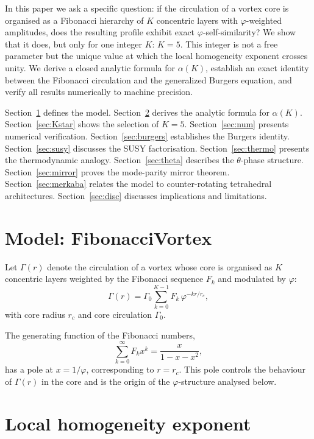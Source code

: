\documentclass[twocolumn,aps,prfluids]{revtex4-2}
\newcommand{\phig}{\varphi}
\newcommand{\Gam}{\Gamma}
\begin{document}
In this paper we ask a specific question: if the circulation of a vortex
core is organised as a Fibonacci hierarchy of $K$ concentric layers with
$\phig$-weighted amplitudes, does the resulting profile exhibit exact
$\phig$-self-similarity? We show that it does, but only for one integer
$K$: $K=5$. This integer is not a free parameter but the unique value
at which the local homogeneity exponent crosses unity. We derive a closed
analytic formula for $\alpha(K)$, establish an exact identity between the
Fibonacci circulation and the generalized Burgers equation, and verify
all results numerically to machine precision.

Section~\ref{sec:model} defines the model. Section~\ref{sec:alpha} derives
the analytic formula for $\alpha(K)$. Section~\ref{sec:Kstar} shows the
selection of $K=5$. Section~\ref{sec:num} presents numerical verification.
Section~\ref{sec:burgers} establishes the Burgers identity.
Section~\ref{sec:susy} discusses the SUSY factorisation.
Section~\ref{sec:thermo} presents the thermodynamic analogy.
Section~\ref{sec:theta} describes the $\theta$-phase structure.
Section~\ref{sec:mirror} proves the mode-parity mirror theorem.
Section~\ref{sec:merkaba} relates the model to counter-rotating
tetrahedral architectures. Section~\ref{sec:disc} discusses implications
and limitations.

\section{Model: FibonacciVortex}
\label{sec:model}

Let $\Gam(r)$ denote the circulation of a vortex whose core is organised
as $K$ concentric layers weighted by the Fibonacci sequence $F_k$ and
modulated by $\phig$:
\begin{equation}
\Gam(r) = \Gam_0 \sum_{k=0}^{K-1} F_k \, \phig^{-k r/r_c},
\label{eq:model}
\end{equation}
with core radius $r_c$ and core circulation $\Gam_0$.

The generating function of the Fibonacci numbers,
\begin{equation}
\sum_{k=0}^{\infty} F_k x^k = \frac{x}{1-x-x^2},
\end{equation}
has a pole at $x = 1/\phig$, corresponding to $r = r_c$. This pole
controls the behaviour of $\Gam(r)$ in the core and is the origin of
the $\phig$-structure analysed below.

\section{Local homogeneity exponent}
\label{sec:alpha}
\end{document}
